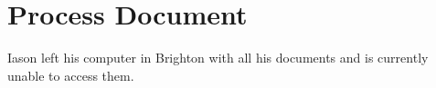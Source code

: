 
\section{Process Document}

Iason left his computer in Brighton with all his documents and is 
currently unable to access them.
